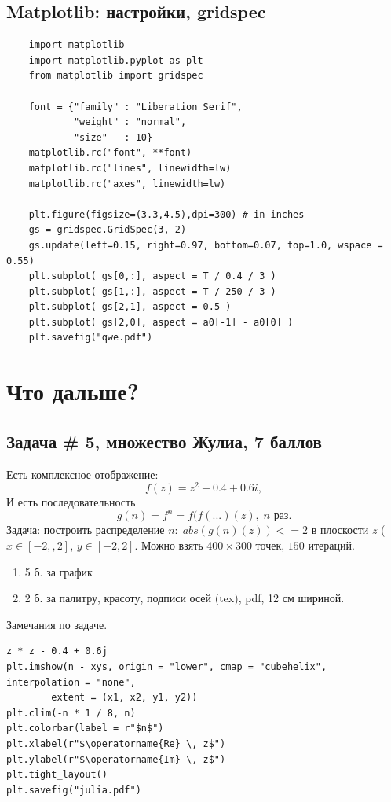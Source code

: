 \documentclass{book}
\begin{document}
\subsection{Matplotlib: настройки, gridspec}

\begin{verbatim}
    import matplotlib
    import matplotlib.pyplot as plt
    from matplotlib import gridspec

    font = {"family" : "Liberation Serif",
            "weight" : "normal",
            "size"   : 10}
    matplotlib.rc("font", **font)
    matplotlib.rc("lines", linewidth=lw)
    matplotlib.rc("axes", linewidth=lw)

    plt.figure(figsize=(3.3,4.5),dpi=300) # in inches
    gs = gridspec.GridSpec(3, 2)
    gs.update(left=0.15, right=0.97, bottom=0.07, top=1.0, wspace = 0.55)
    plt.subplot( gs[0,:], aspect = T / 0.4 / 3 )
    plt.subplot( gs[1,:], aspect = T / 250 / 3 )
    plt.subplot( gs[2,1], aspect = 0.5 )
    plt.subplot( gs[2,0], aspect = a0[-1] - a0[0] )
    plt.savefig("qwe.pdf")
\end{verbatim}

\section{Что дальше?}

\subsection{Задача \# 5, множество Жулиа, 7 баллов}

Есть комплексное отображение:
\begin{equation}
    f(z) = z^2 - 0.4 + 0.6 i,
\end{equation}
И есть последовательность
\begin{equation}
    g(n) = f^n = f(f( ...)(z), \; n \text{ раз}.
\end{equation}
Задача: построить распределение $n: \; abs(g(n)(z)) <= 2$ в плоскости $z$ ($x \in
[-2,, 2]$, $y \in [-2, 2]$. Можно взять $400 \times 300$ точек, $150$ итераций.
\begin{enumerate}
\item 5 б. за график
\item 2 б. за палитру, красоту, подписи осей (tex), pdf, 12 см шириной.
\end{enumerate}

Замечания по задаче.
\begin{verbatim}
z * z - 0.4 + 0.6j
plt.imshow(n - xys, origin = "lower", cmap = "cubehelix", interpolation = "none",
        extent = (x1, x2, y1, y2))
plt.clim(-n * 1 / 8, n)
plt.colorbar(label = r"$n$")
plt.xlabel(r"$\operatorname{Re} \, z$")
plt.ylabel(r"$\operatorname{Im} \, z$")
plt.tight_layout()
plt.savefig("julia.pdf")
\end{verbatim}
\end{document}
